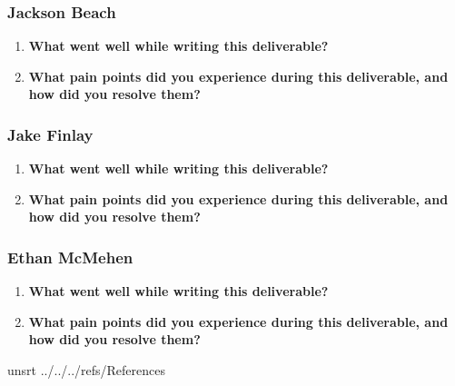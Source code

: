 \documentclass[10pt, titlepage]{article}
\begin{document}
\subsubsection*{Jackson Beach}

\begin{enumerate}
\item \textbf{What went well while writing this deliverable?}


\item \textbf{What pain points did you experience during this deliverable,
    and how did you resolve them?}

\end{enumerate}

\subsubsection*{Jake Finlay}

\begin{enumerate}
\item \textbf{What went well while writing this deliverable?}


\item \textbf{What pain points did you experience during this deliverable,
    and how did you resolve them?}

\end{enumerate}

\subsubsection*{Ethan McMehen}

\begin{enumerate}
\item \textbf{What went well while writing this deliverable?}


\item \textbf{What pain points did you experience during this deliverable,
    and how did you resolve them?}

\end{enumerate}

\newpage
 {unsrt}
 {../../../refs/References}
\end{document}
